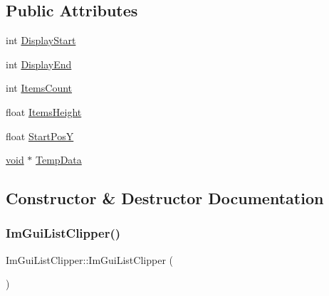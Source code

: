 \subsection*{Public Attributes}
\begin{DoxyCompactItemize}
\item 
int \hyperlink{structImGuiListClipper_a9d096e06e5633fd77a8a209c00fe454a}{Display\+Start}
\item 
int \hyperlink{structImGuiListClipper_aa49e30d04ad8f8b95fbaa62dfbb4ea3e}{Display\+End}
\item 
int \hyperlink{structImGuiListClipper_a4e2b4e8efe10615d04ad2aeea467f522}{Items\+Count}
\item 
float \hyperlink{structImGuiListClipper_a19762cb78ff0adccb414027c25678a60}{Items\+Height}
\item 
float \hyperlink{structImGuiListClipper_affee91b338520cd4bd59b5b680dcb5ae}{Start\+PosY}
\item 
\hyperlink{imgui__impl__opengl3__loader_8h_ac668e7cffd9e2e9cfee428b9b2f34fa7}{void} $\ast$ \hyperlink{structImGuiListClipper_a596215ed18fa6d4094d9bf4da975e1be}{Temp\+Data}
\end{DoxyCompactItemize}


\subsection{Constructor \& Destructor Documentation}
\mbox{\label{structImGuiListClipper_af42c878888a906ead11489a600cb6768}} 
\subsubsection{\texorpdfstring{Im\+Gui\+List\+Clipper()}{ImGuiListClipper()}\hspace{0.1cm}{\footnotesize\ttfamily [1/2]}}
{\footnotesize\ttfamily Im\+Gui\+List\+Clipper\+::\+Im\+Gui\+List\+Clipper (\begin{DoxyParamCaption}{ }\end{DoxyParamCaption})}

\mbox{\label{structImGuiListClipper_ada915f0ae4446df73c1a2372bde65293}} 
